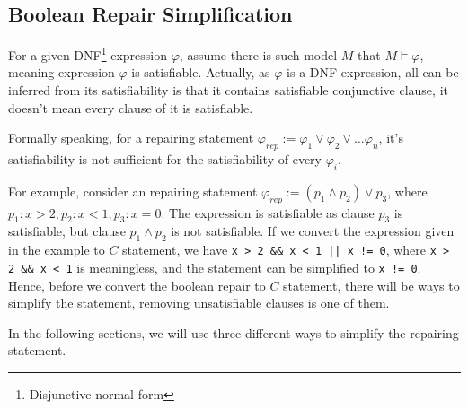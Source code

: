 \subsection{Boolean Repair Simplification}
\label{section:BooleanRepairSimplification}
For a given DNF\footnote{Disjunctive normal form} expression $\varphi$, assume there is such model $M$ that $M \models \varphi$, meaning expression $\varphi$ is satisfiable.
Actually, as $\varphi$ is a DNF expression, all can be inferred from its satisfiability is that it contains satisfiable conjunctive clause, it doesn't mean every clause of it is satisfiable.

Formally speaking, for a repairing statement $\varphi _{rep} := \varphi _{1} \vee \varphi _{2} \vee \dots \varphi _{n}$, it's satisfiability is not sufficient for the satisfiability of every $\varphi _{i}$.

For example, consider an repairing statement $\varphi _{rep} := (p_{1} \wedge p_{2}) \vee p_{3}$, where $p_{1} : x > 2, p_{2} : x < 1, p_{3} : x = 0$. The expression is satisfiable as clause $p_{3}$ is satisfiable,
but clause $p_{1} \wedge p_{2}$ is not satisfiable.
If we convert the expression given in the example to $C$ statement, we have \lstinline{x > 2 && x < 1 || x != 0}, where \lstinline|x > 2 && x < 1| is meaningless, and the statement can be simplified to \lstinline|x != 0|.
Hence, before we convert the boolean repair to $C$ statement, there will be ways to simplify the statement, removing unsatisfiable clauses is one of them.

In the following sections, we will use three different ways to simplify the repairing statement.

